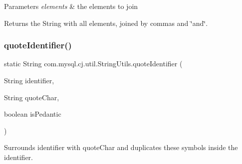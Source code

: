 \begin{DoxyParams}{Parameters}
{\em elements} & the elements to join \\
\hline
\end{DoxyParams}
\begin{DoxyReturn}{Returns}
the String with all elements, joined by commas and \char`\"{}and\char`\"{}. 
\end{DoxyReturn}
\mbox{\label{classcom_1_1mysql_1_1cj_1_1util_1_1_string_utils_a6dc94c9c54c7fe3fafd33cc4d3092ee1}} 
\subsubsection{\texorpdfstring{quote\+Identifier()}{quoteIdentifier()}\hspace{0.1cm}{\footnotesize\ttfamily [1/2]}}
{\footnotesize\ttfamily static String com.\+mysql.\+cj.\+util.\+String\+Utils.\+quote\+Identifier (\begin{DoxyParamCaption}\item[{String}]{identifier,  }\item[{String}]{quote\+Char,  }\item[{boolean}]{is\+Pedantic }\end{DoxyParamCaption})\hspace{0.3cm}{\ttfamily [static]}}

Surrounds identifier with quote\+Char and duplicates these symbols inside the identifier.


